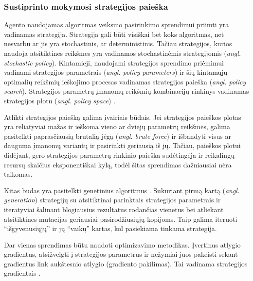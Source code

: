 \documentclass{VUMIFPSbakalaurinis}
\begin{document}
\subsubsection{Sustiprinto mokymosi strategijos paieška}
{
	Agento naudojamas algoritmas veiksmo pasirinkimo sprendimui priimti yra vadinamas strategija. Strategija gali būti visiškai bet koks algoritmas, net nesvarbu ar jis yra stochastinis, ar deterministinis. Tačiau strategijos, kurios naudoja atsitiktines reikšmes yra vadinamos stochastinėmis strategijomis (\textit{angl. stochastic policy}). Kintamieji, naudojami strategijos sprendimo priėmimui vadinami strategijos parametrais (\textit{angl. policy parameters}) ir šių kintamųjų optimalių reikšmių ieškojimo procesas vadinamas strategijos paieška (\textit{angl. policy search}). Strategijos parametrų įmanomų reikšmių kombinacijų rinkinys vadinamas strategijos plotu (\textit{angl. policy space}) \cite{handson}.\par
	
	Atlikti strategijos paiešką galima įvairiais būdais. Jei strategijos paieškos plotas yra reliatyviai mažas ir ieškoma vieno ar dviejų parametrų reikšmės, galima pasitelkti paprasčiausią brutalią jėgą (\textit{angl. brute force}) ir išbandyti visus ar dauguma įmanomų variantų ir pasirinkti geriausią iš jų. Tačiau, paieškos plotui didėjant, gero strategijos parametrų rinkinio paieška sudėtingėja ir reikalingų resursų skaičius eksponentiškai kylą, todėl šitas sprendimas dažniausiai nėra taikomas.\par
	
	Kitas būdas yra pasitelkti genetinius algoritmus \cite{genetic_algorithm_book}. Sukuriant pirmą kartą (\textit{angl. generation}) strategijų su atsitiktinai parinktais strategijos parametrais ir iteratyviai šalinant blogiausius rezultatus rodančias vienetus bei atliekant atsitiktines mutacijas geriausiai pasirodžiusiųjų kopijoms. Taip galima iteruoti \enquote{išgyvenusiųjų} ir jų \enquote{vaikų} kartas, kol pasiekiama tinkama strategija. \par
	
	Dar vienas sprendimas būtu naudoti optimizavimo metodikas. Įvertinus atlygio gradientus, atsižvelgti į strategijos parametrus ir nežymiai juos pakeisti sekant gradientus link aukštesnio atlygio (gradiento pakilimas). Tai vadinama strategijos gradientais \cite{handson}.	
}
\end{document}
